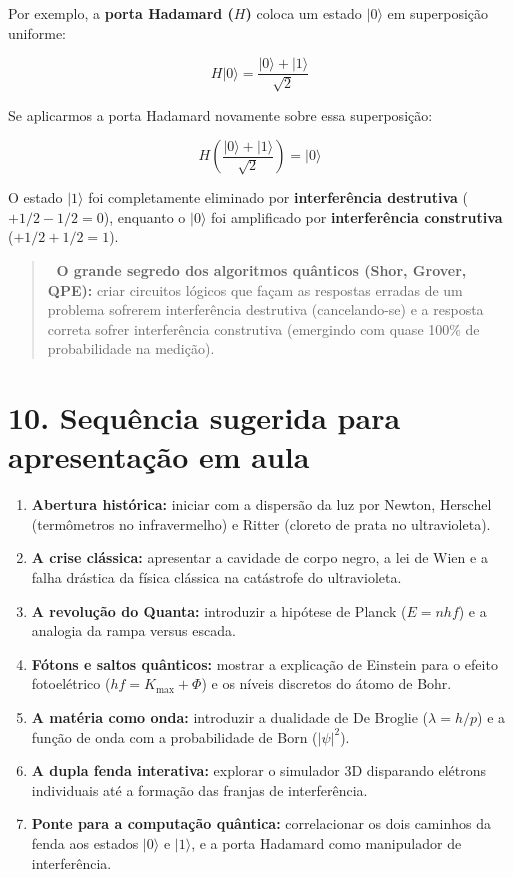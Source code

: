 \documentclass[
  brazilian,
]{report}
\providecommand{\tightlist}{%
  \setlength{\itemsep}{0pt}\setlength{\parskip}{0pt}}
\begin{document}
Por exemplo, a \textbf{porta Hadamard (\(H\))} coloca um estado
\(|0\rangle\) em superposição uniforme:

\[
H|0\rangle = \frac{|0\rangle + |1\rangle}{\sqrt{2}}
\]

Se aplicarmos a porta Hadamard novamente sobre essa superposição:

\[
H \left( \frac{|0\rangle + |1\rangle}{\sqrt{2}} \right) = |0\rangle
\]

O estado \(|1\rangle\) foi completamente eliminado por
\textbf{interferência destrutiva} (\(+1/2 - 1/2 = 0\)), enquanto o
\(|0\rangle\) foi amplificado por \textbf{interferência construtiva}
(\(+1/2 + 1/2 = 1\)).

\begin{quote}
🚀 \textbf{O grande segredo dos algoritmos quânticos (Shor, Grover,
QPE):} criar circuitos lógicos que façam as respostas erradas de um
problema sofrerem interferência destrutiva (cancelando-se) e a resposta
correta sofrer interferência construtiva (emergindo com quase 100\% de
probabilidade na medição).
\end{quote}

\section{10. Sequência sugerida para apresentação em
aula}\label{sequuxeancia-sugerida-para-apresentauxe7uxe3o-em-aula}

\begin{enumerate}
\def\labelenumi{\arabic{enumi}.}
\tightlist
\item
  \textbf{Abertura histórica:} iniciar com a dispersão da luz por
  Newton, Herschel (termômetros no infravermelho) e Ritter (cloreto de
  prata no ultravioleta).
\item
  \textbf{A crise clássica:} apresentar a cavidade de corpo negro, a lei
  de Wien e a falha drástica da física clássica na catástrofe do
  ultravioleta.
\item
  \textbf{A revolução do Quanta:} introduzir a hipótese de Planck
  (\(E = nhf\)) e a analogia da rampa versus escada.
\item
  \textbf{Fótons e saltos quânticos:} mostrar a explicação de Einstein
  para o efeito fotoelétrico (\(hf = K_{\max} + \Phi\)) e os níveis
  discretos do átomo de Bohr.
\item
  \textbf{A matéria como onda:} introduzir a dualidade de De Broglie
  (\(\lambda = h/p\)) e a função de onda com a probabilidade de Born
  (\(|\psi|^2\)).
\item
  \textbf{A dupla fenda interativa:} explorar o simulador 3D disparando
  elétrons individuais até a formação das franjas de interferência.
\item
  \textbf{Ponte para a computação quântica:} correlacionar os dois
  caminhos da fenda aos estados \(|0\rangle\) e \(|1\rangle\), e a porta
  Hadamard como manipulador de interferência.
\end{enumerate}
\end{document}
